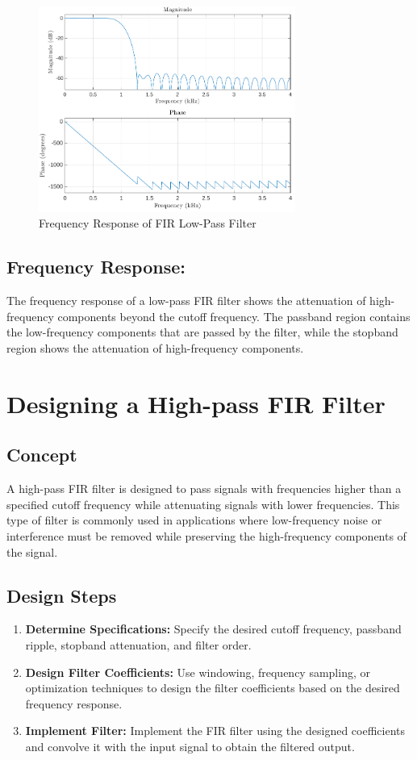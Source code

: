 \documentclass{zc-ust-hw}
\begin{document}
\begin{figure}[htbp]
  \centering
  \includegraphics[width=0.75\textwidth]{figures/low-pass-fir-filter.pdf}
  \caption{Frequency Response of FIR Low-Pass Filter}
\end{figure}

\subsection{Frequency Response:} The frequency response of a low-pass
FIR filter shows the attenuation of high-frequency components beyond the
cutoff frequency. The passband region contains the low-frequency
components that are passed by the filter, while the stopband region
shows the attenuation of high-frequency components.

\section{Designing a High-pass FIR Filter}

\subsection{Concept} A high-pass FIR filter is designed to pass signals with
frequencies higher than a specified cutoff frequency while attenuating signals
with lower frequencies. This type of filter is commonly used in applications
where low-frequency noise or interference must be removed while preserving the
high-frequency components of the signal.

\subsection{Design Steps}
\begin{enumerate}
  \item \textbf{Determine Specifications:} Specify the desired cutoff
    frequency, passband ripple, stopband attenuation, and filter order.
  \item \textbf{Design Filter Coefficients:} Use windowing, frequency
    sampling, or optimization techniques to design the filter
    coefficients based on the desired frequency response.
  \item \textbf{Implement Filter:} Implement the FIR filter using the
    designed coefficients and convolve it with the input signal to
    obtain the filtered output.
\end{enumerate}
\end{document}

